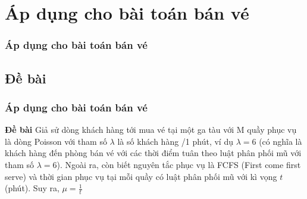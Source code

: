 \documentclass[10pt]{beamer}
\begin{document}
\section{Áp dụng cho bài toán bán vé}
\begin{frame}
	\frametitle{Áp dụng cho bài toán bán vé}
\end{frame}
\subsection{Đề bài}
\begin{frame}
	\frametitle{Áp dụng cho bài toán bán vé}
	\begin{block}{\textbf{Đề bài}}
	Giả sử dòng khách hàng tới mua vé tại một ga tàu với M quầy phục vụ là dòng Poisson	với tham số $\lambda$ là số khách hàng /1 phút, ví dụ $\lambda = 6$ (có nghĩa là khách hàng đến phòng bán vé với các thời điểm tuân theo luật phân phối mũ với tham số $\lambda = 6$). Ngoài ra, còn biết nguyên tắc phục vụ là FCFS (First come first serve) và thời gian phục vụ tại mỗi quầy có luật phân phối mũ với kì vọng $t$ (phút). Suy ra, $\mu = \frac{1}{t}$ 
	\end{block}	
\end{frame}

\end{document}
